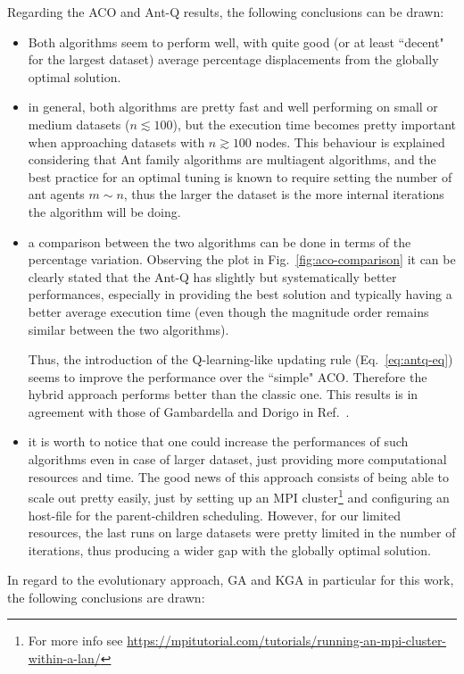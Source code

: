 \documentclass[10pt]{article}
\begin{document}
Regarding the ACO and Ant-Q results, the following conclusions can be drawn:
\begin{itemize}
\item Both algorithms seem to perform well, with quite good (or at least ``decent" for the largest dataset) average percentage displacements from the globally optimal solution.

\item in general, both algorithms are pretty fast and well performing on small or medium datasets ($n \lesssim 100$), but the execution time becomes pretty important when approaching datasets with $n \gtrsim 100$ nodes. This behaviour is explained considering that Ant family algorithms are multiagent algorithms, and the best practice for an optimal tuning is known to require setting the number of ant agents $m \sim n$, thus the larger the dataset is the more internal iterations the algorithm will be doing.

\item a comparison between the two algorithms can be done in terms of the percentage variation. Observing the plot in Fig.~\ref{fig:aco-comparison} it can be clearly stated that the Ant-Q has slightly but systematically better performances, especially in providing the best solution and typically having a better average execution time (even though the magnitude order remains similar between the two algorithms).

Thus, the introduction of the Q-learning-like updating rule (Eq.~\ref{eq:antq-eq}) seems to improve the performance over the ``simple" ACO. Therefore the hybrid approach performs better than the classic one. 
This results is in agreement with those of Gambardella and Dorigo in Ref.~\cite{undici}.

\item it is worth to notice that one could increase the performances of such algorithms even in case of larger dataset, just providing more computational resources and time. The good news of this approach consists of being able to scale out pretty easily, just by setting up an MPI cluster\footnote{For more info see \url{https://mpitutorial.com/tutorials/running-an-mpi-cluster-within-a-lan/}} and configuring an host-file for the parent-children scheduling.
However, for our limited resources, the last runs on large datasets were pretty limited in the number of iterations, thus producing a wider gap with the globally optimal solution.
\end{itemize}
In regard to  the evolutionary approach, GA and KGA in particular for this work, the following conclusions are drawn:
\end{document}
